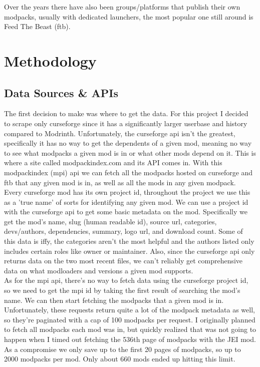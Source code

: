 \documentclass[a4paper,11pt, twocolumn]{article}
\begin{document}
Over the years there have also been groups/platforms that publish their own modpacks, usually with dedicated launchers, the most popular one still around is Feed The Beast (ftb).

\section{Methodology}

\subsection{Data Sources \& APIs}

The first decision to make was where to get the data. For this project I decided to scrape only curseforge since it has a significantly larger userbase and history compared to Modrinth. Unfortunately, the curseforge api isn't the greatest, specifically it has no way to get the dependents of a given mod, meaning no way to see what modpacks a given mod is in or what other mods depend on it. This is where a site called modpackindex.com and its API comes in. With this modpackindex (mpi) api we can fetch all the modpacks hosted on curseforge and ftb that any given mod is in, as well as all the mods in any given modpack.\\

Every curseforge mod has its own project id, throughout the project we use this as a 'true name' of sorts for identifying any given mod. We can use a project id with the curseforge api to get some basic metadata on the mod. Specifically we get the mod's name, slug (human readable id), source url, categories, devs/authors, dependencies, summary, logo url, and download count. Some of this data is iffy, the categories aren't the most helpful and the authors listed only includes certain roles like owner or maintainer. Also, since the curseforge api only returns data on the two most recent files, we can't reliably get comprehensive data on what modloaders and versions a given mod supports.\\

As for the mpi api, there's no way to fetch data using the curseforge project id, so we need to get the mpi id by taking the first result of searching the mod's name. We can then start fetching the modpacks that a given mod is in. Unfortunately, these requests return quite a lot of the modpack metadata as well, so they're paginated with a cap of 100 modpacks per request. I originally planned to fetch all modpacks each mod was in, but quickly realized that was not going to happen when I timed out fetching the 536th page of modpacks with the JEI mod. As a compromise we only save up to the first 20 pages of modpacks, so up to 2000 modpacks per mod. Only about 660 mods ended up hitting this limit.\\
\end{document}
